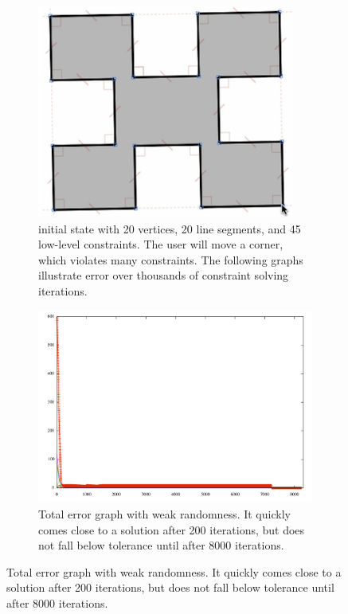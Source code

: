 \begin{landscape}
\begin{figure}
  \centering
  \begin{subfigure}[t]{0.44\textwidth}
    \centering
    \includegraphics[width=0.7\linewidth]{img/jessica-constraint-example.png}
    \caption{initial state with 20 vertices, 20 line segments,
      and 45 low-level constraints. The user will move a corner, which
      violates many constraints. The following graphs illustrate error
      over thousands of constraint solving iterations.}
    \label{fig:jessica-initial}
  \end{subfigure}
  \hspace{0.03\textwidth}
  \begin{subfigure}[t]{0.44\textwidth}
    \centering
    \includegraphics[width=\linewidth]{img/jessica-norandom.png}
    \caption{Total error graph with weak randomness. It quickly comes
      close to a solution after 200 iterations, but does not fall
      below tolerance until after 8000 iterations.}
    \label{fig:jessica-norandom}
  \end{subfigure}


\end{figure}
\end{landscape}
